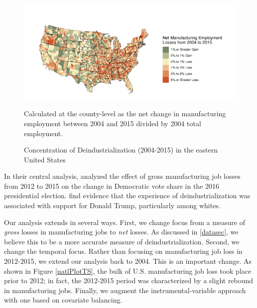 \documentclass[]{AEA}
\begin{document}
\FloatBarrier
\begin{figure} 
\caption{Concentration of Deindustrialization (2004-2015) in the eastern United States }
\label{ManuMap}

\begin{center}\includegraphics{Final-Draft_files/figure-latex/unnamed-chunk-2-1} \end{center}



\FloatBarrier
\begin{figurenotes}
Calculated at the county-level as the net change in manufacturing employment between 2004 and 2015 divided by 2004 total employment.
\end{figurenotes}
\end{figure}
\FloatBarrier

In their central analysis, \cite{Baccini21} analyzed the effect of gross
manufacturing job losses from 2012 to 2015 on the change in Democratic
vote share in the 2016 presidential election. \cite{Baccini21} find
evidence that the experience of deindustrialization was associated with
support for Donald Trump, particularly among whites.

Our analysis extends \cite{Baccini21} in several ways. First, we change
focus from a measure of \emph{gross} losses in manufacturing jobs to
\emph{net} losses. As discussed in \ref{datasec}, we believe this to be
a more accurate measure of deindustrialization. Second, we change the
temporal focus. Rather than focusing on manufacturing job loss in
2012-2015, we extend our analysis back to 2004. This is an important
change. As shown in Figure \ref{natlPlotTS}, the bulk of U.S.
manufacturing job loss took place prior to 2012; in fact, the 2012-2015
period was characterized by a slight rebound in manufacturing jobs.
Finally, we augment the instrumental-variable approach with one based on
covariate balancing.
\end{document}
